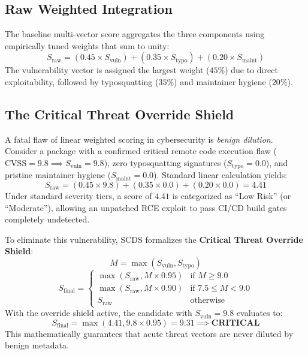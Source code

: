 \subsection{Raw Weighted Integration}
The baseline multi-vector score aggregates the three components using empirically tuned weights that sum to unity:
\begin{equation}
S_{\text{raw}} = (0.45 \times S_{\text{vuln}}) + (0.35 \times S_{\text{typo}}) + (0.20 \times S_{\text{maint}})
\end{equation}
The vulnerability vector is assigned the largest weight ($45\%$) due to direct exploitability, followed by typosquatting ($35\%$) and maintainer hygiene ($20\%$).

\subsection{The Critical Threat Override Shield}
\label{sec:method_override}
A fatal flaw of linear weighted scoring in cybersecurity is \textit{benign dilution}. Consider a package with a confirmed critical remote code execution flaw ($\text{CVSS} = 9.8 \implies S_{\text{vuln}} = 9.8$), zero typosquatting signatures ($S_{\text{typo}} = 0.0$), and pristine maintainer hygiene ($S_{\text{maint}} = 0.0$). Standard linear calculation yields:
\begin{equation}
S_{\text{raw}} = (0.45 \times 9.8) + (0.35 \times 0.0) + (0.20 \times 0.0) = 4.41
\end{equation}
Under standard severity tiers, a score of $4.41$ is categorized as ``Low Risk'' (or ``Moderate''), allowing an unpatched RCE exploit to pass CI/CD build gates completely undetected.

To eliminate this vulnerability, SCDS formalizes the \textbf{Critical Threat Override Shield}:
\begin{equation}
M = \max(S_{\text{vuln}}, S_{\text{typo}})
\end{equation}
\begin{equation}
S_{\text{final}} = \begin{cases}
\max(S_{\text{raw}}, M \times 0.95) & \text{if } M \ge 9.0 \\
\max(S_{\text{raw}}, M \times 0.90) & \text{if } 7.5 \le M < 9.0 \\
S_{\text{raw}} & \text{otherwise}
\end{cases}
\end{equation}
With the override shield active, the candidate with $S_{\text{vuln}} = 9.8$ evaluates to:
\begin{equation}
S_{\text{final}} = \max(4.41, 9.8 \times 0.95) = 9.31 \implies \textbf{CRITICAL}
\end{equation}
This mathematically guarantees that acute threat vectors are never diluted by benign metadata.

